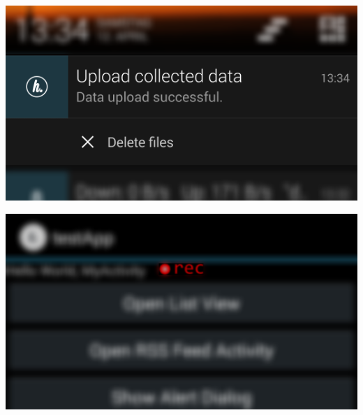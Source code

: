 \begin{minipage}[t]{0.45\linewidth}
	\centering
	\includegraphics[width=\linewidth]{img/notification_upload_finished}
	 \label{fig:notification_upload_finished}
\end{minipage}
\hfill
\begin{minipage}[t]{0.45\linewidth}
	\centering
	\includegraphics[width=\linewidth]{img/record_on_top_icon}
	 \label{fig:icon_record_on_top}
\end{minipage}

